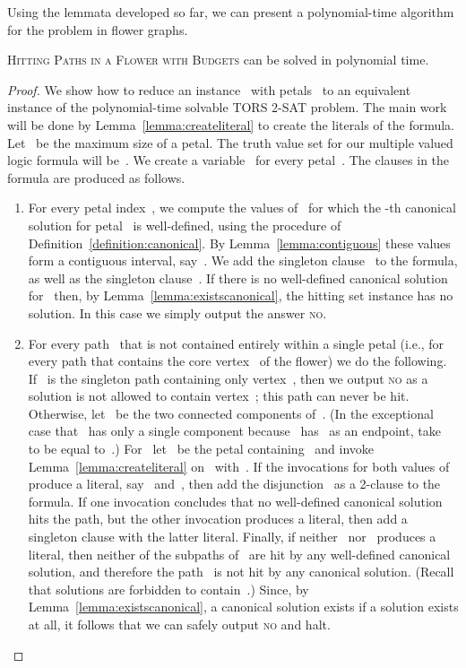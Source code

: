 \let\accentvec\vec  \documentclass{llncs}
\newcommand{\no}{\textsc{no}\xspace}
\newcommand{\HitPathsInFlower}{\textsc{Hitting Paths in a Flower with Budgets}\xspace}
\newcommand{\TORSTwoSat}{\textsc{TORS 2-SAT}\xspace}
\begin{document}
Using the lemmata developed so far, we can present a polynomial-time algorithm for the problem in flower graphs.

\begin{theorem} \label{theorem:pathsinflower:poly}
\HitPathsInFlower can be solved in polynomial time.
\end{theorem}
\begin{proof}
We show how to reduce an instance~ with petals~ to an equivalent instance of the polynomial-time solvable \TORSTwoSat problem. The main work will be done by Lemma~\ref{lemma:createliteral} to create the literals of the formula. Let~ be the maximum size of a petal. The truth value set for our multiple valued logic formula will be~. We create a variable~ for every petal~. The clauses in the formula are produced as follows.

\begin{enumerate}
	\item For every petal index~, we compute the values of~ for which the -th canonical solution for petal~ is well-defined, using the procedure of Definition~\ref{definition:canonical}. By Lemma~\ref{lemma:contiguous} these values form a contiguous interval, say~. We add the singleton clause~ to the formula, as well as the singleton clause~. If there is no well-defined canonical solution for~ then, by Lemma~\ref{lemma:existscanonical}, the hitting set instance has no solution. In this case we simply output the answer \no.
	\item For every path~ that is not contained entirely within a single petal (i.e., for every path that contains the core vertex~ of the flower) we do the following. If~ is the singleton path containing only vertex~, then we output \no as a solution is not allowed to contain vertex~; this path can never be hit. Otherwise, let~ be the two connected components of~. (In the exceptional case that~ has only a single component because~ has~ as an endpoint, take~ to be equal to~.) For~ let~ be the petal containing~ and invoke Lemma~\ref{lemma:createliteral} on~ with~. If the invocations for both values of~ produce a literal, say~ and~, then add the disjunction~ as a 2-clause to the formula. If one invocation concludes that no well-defined canonical solution hits the path, but the other invocation produces a literal, then add a singleton clause with the latter literal. Finally, if neither~ nor~ produces a literal, then neither of the subpaths of~ are hit by any well-defined canonical solution, and therefore the path~ is not hit by any canonical solution. (Recall that solutions are forbidden to contain~.)  Since, by Lemma~\ref{lemma:existscanonical}, a canonical solution exists if a solution exists at all, it follows that we can safely output \no and halt.
\end{enumerate}


\end{proof}
\end{document}
